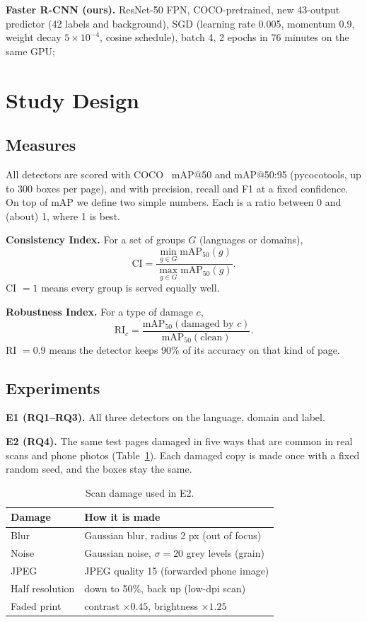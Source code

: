 \textbf{Faster R-CNN (ours).} ResNet-50 FPN, COCO-pretrained, new 43-output predictor (42 labels and background),
SGD (learning rate 0.005, momentum 0.9, weight decay $5\times10^{-4}$, cosine schedule), batch 4, 2 epochs in 76
minutes on the same GPU; %

\section{Study Design}
\subsection{Measures}
All detectors are scored with COCO~\cite{coco} mAP@50 and mAP@50:95 (pycocotools, up to 300 boxes per page), and with
precision, recall and F1 at a fixed confidence. On top of mAP we define two simple numbers. Each is a ratio
between 0 and (about) 1, where 1 is best.

\textbf{Consistency Index.} For a set of groups $G$ (languages or domains),
\begin{equation}
\mathrm{CI} = \frac{\min_{g \in G} \mathrm{mAP}_{50}(g)}{\max_{g \in G} \mathrm{mAP}_{50}(g)}.
\end{equation}
CI $=1$ means every group is served equally well.

\textbf{Robustness Index.} For a type of damage $c$,
\begin{equation}
\mathrm{RI}_c = \frac{\mathrm{mAP}_{50}(\text{damaged by } c)}{\mathrm{mAP}_{50}(\text{clean})}.
\end{equation}
RI $=0.9$ means the detector keeps 90\% of its accuracy on that kind of page.

\subsection{Experiments}
\textbf{E1 (RQ1--RQ3).} All three detectors on the %
language, domain and label.

\textbf{E2 (RQ4).} The same test pages damaged in five ways that are common in real scans and phone photos
(Table~\ref{tab:corr}). Each damaged copy is made once with a fixed random seed, and the boxes stay the same.

\begin{table}[t]
\centering
\caption{Scan damage used in E2.}
\label{tab:corr}
\small
\begin{tabular}{ll}
\toprule
Damage & How it is made \\
\midrule
Blur & Gaussian blur, radius 2 px (out of focus) \\
Noise & Gaussian noise, $\sigma = 20$ grey levels (grain) \\
JPEG & JPEG quality 15 (forwarded phone image) \\
Half resolution & down to 50\%, back up (low-dpi scan) \\
Faded print & contrast $\times 0.45$, brightness $\times 1.25$ \\
\bottomrule
\end{tabular}
\end{table}

